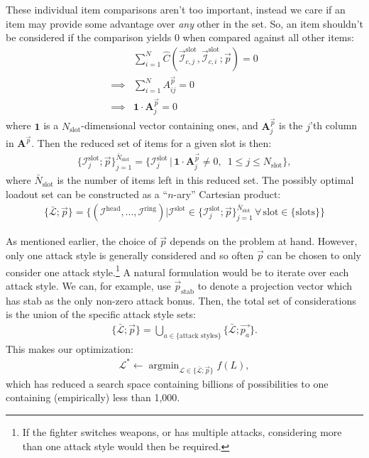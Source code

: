 		These individual item comparisons aren't too important, instead we care if an item may provide some advantage over \emph{any} other in the set. So, an item shouldn't be considered if the comparison yields 0 when compared against all other items:
		\begin{align}
		    &\sum_{i=1}^N \hat C (\vec{\mathcal{I}}_{c, j}^\text{slot}, \vec{\mathcal{I}}_{c, i}^\text{slot}; \vec{p}) = 0\\
		    \implies&\sum_{i=1}^N A_{ij}^{\vec{p}} = 0\\
		    \implies&\boldsymbol{1}\cdot\boldsymbol{A}_j^{\vec{p}} = 0
		\end{align}
		where $\boldsymbol{1}$ is a $N_\text{slot}$-dimensional vector containing ones, and $\boldsymbol{A}_j^{\vec{p}}$ is the $j$'th column in $\boldsymbol{A}^{\vec{p}}$.
		Then the reduced set of items for a given slot is then:
		\begin{align}
		    \{\mathcal{I}^\text{slot}_j; \vec{p}\}_{j=1}^{\bar{N}_\text{slot}} = \{\mathcal{I}_j^\text{slot}\,|\,\boldsymbol{1}\cdot\boldsymbol{A}_j^{\vec{p}} \neq 0,\,\,\, 1 \leq j \leq N_\text{slot}\},
		\end{align}
		where $\bar{N}_\text{slot}$ is the number of items left in this reduced set. The possibly optimal loadout set can be constructed as a ``$n$-ary'' Cartesian product:
		\begin{align}
			\{\bar{\mathcal{L}}; \vec{p}\} = \{(\mathcal{I}^\text{head}, ..., \mathcal{I}^\text{ring}) | \mathcal{I}^\text{slot} \in \{\mathcal{I}^\text{slot}_j; \vec{p}\}_{j=1}^{\bar{N}_\text{slot}} \,\forall\, \text{slot} \in \{\text{slots}\}\}
		\end{align}

		As mentioned earlier, the choice of $\vec p$ depends on the problem at hand. However, only one attack style is generally considered and so often $\vec p$ can be chosen to only consider one attack style.\footnote{If the fighter switches weapons, or has multiple attacks, considering more than one attack style would then be required.} A natural formulation would be to iterate over each attack style. We can, for example, use $\vec{p}_\text{stab}$ to denote a projection vector which has stab as the only non-zero attack bonus. Then, the total set of considerations is the union of the specific attack style sets:
		\begin{align}
		    \{\bar{\mathcal{L}}; \vec{p}\} = \bigcup_{a\in \{\text{attack styles}\}}  \{\bar{\mathcal{L}}; \vec{p_a}\}.
		\end{align}
		This makes our optimization:
		\begin{align}
			\mathcal{L}^* \leftarrow \mathop{\mathrm{argmin}}_{\mathcal{L} \in \{\bar{\mathcal{L}}; \vec{p}\}} f(L),
		\end{align}
		which has reduced a search space containing billions of possibilities to one containing (empirically) less than 1,000.



